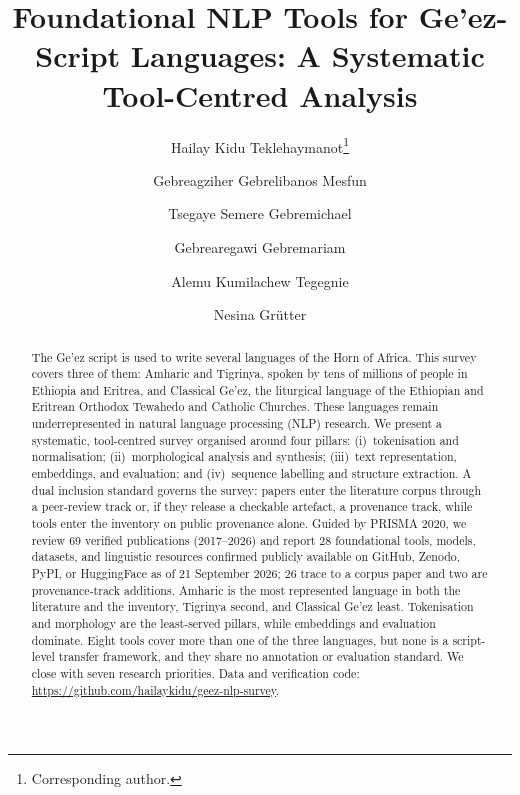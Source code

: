 \documentclass[runningheads]{llncs}
\begin{document}
\title{Foundational NLP Tools for Ge'ez-Script Languages: A Systematic Tool-Centred Analysis}

\author{Hailay Kidu Teklehaymanot\thanks{Corresponding author.} \and
Gebreagziher Gebrelibanos Mesfun \and
Tsegaye Semere Gebremichael \and
Gebrearegawi Gebremariam \and
Alemu Kumilachew Tegegnie \and
Nesina Gr\"{u}tter}


\maketitle

\begin{abstract}
The Ge'ez script is used to write several languages of the Horn of Africa. This survey covers three of them: Amharic and Tigrinya, spoken by tens of millions of people in Ethiopia and Eritrea, and Classical Ge'ez, the liturgical language of the Ethiopian and Eritrean Orthodox Tewahedo and Catholic Churches. These languages remain underrepresented in natural language processing (NLP) research. We present a systematic, tool-centred survey organised around four pillars: (i)~tokenisation and normalisation; (ii)~morphological analysis and synthesis; (iii)~text representation, embeddings, and evaluation; and (iv)~sequence labelling and structure extraction. A dual inclusion standard governs the survey: papers enter the literature corpus through a peer-review track or, if they release a checkable artefact, a provenance track, while tools enter the inventory on public provenance alone. Guided by PRISMA 2020, we review 69 verified publications (2017--2026) and report 28 foundational tools, models, datasets, and linguistic resources confirmed publicly available on GitHub, Zenodo, PyPI, or HuggingFace as of 21 September 2026; 26 trace to a corpus paper and two are provenance-track additions. Amharic is the most represented language in both the literature and the inventory, Tigrinya second, and Classical Ge'ez least. Tokenisation and morphology are the least-served pillars, while embeddings and evaluation dominate. Eight tools cover more than one of the three languages, but none is a script-level transfer framework, and they share no annotation or evaluation standard. We close with seven research priorities. Data and verification code: \url{https://github.com/hailaykidu/geez-nlp-survey}.

\end{abstract}
\end{document}
